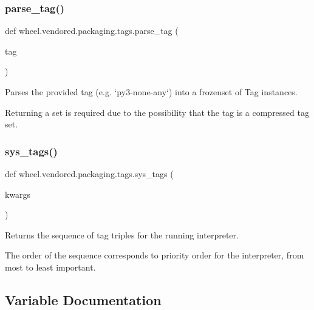 \subsubsection{\texorpdfstring{parse\+\_\+tag()}{parse\_tag()}}
{\footnotesize\ttfamily def wheel.\+vendored.\+packaging.\+tags.\+parse\+\_\+tag (\begin{DoxyParamCaption}\item[{}]{tag }\end{DoxyParamCaption})}

\begin{DoxyVerb}Parses the provided tag (e.g. `py3-none-any`) into a frozenset of Tag instances.

Returning a set is required due to the possibility that the tag is a
compressed tag set.
\end{DoxyVerb}
 \mbox{\label{namespacewheel_1_1vendored_1_1packaging_1_1tags_a08f919d05b93256070a44ce8107250a1}} 
\subsubsection{\texorpdfstring{sys\+\_\+tags()}{sys\_tags()}}
{\footnotesize\ttfamily def wheel.\+vendored.\+packaging.\+tags.\+sys\+\_\+tags (\begin{DoxyParamCaption}\item[{}]{kwargs }\end{DoxyParamCaption})}

\begin{DoxyVerb}Returns the sequence of tag triples for the running interpreter.

The order of the sequence corresponds to priority order for the
interpreter, from most to least important.
\end{DoxyVerb}
 

\subsection{Variable Documentation}
\mbox{\label{namespacewheel_1_1vendored_1_1packaging_1_1tags_a56fe435135f96020e683c429da949861}} 
